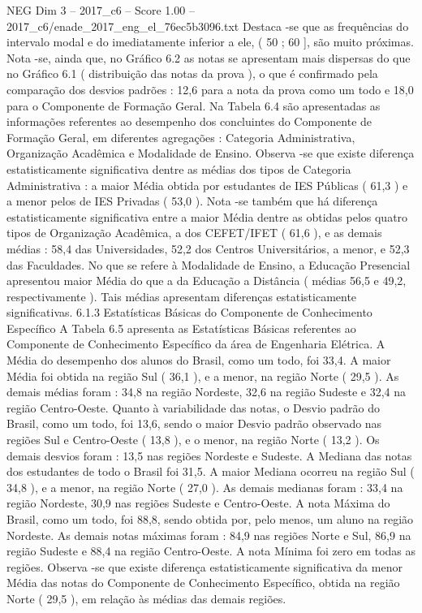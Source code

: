 \begin{textsample}{NEG Dim 3 – 2017\_c6 – Score 1.00 – 2017\_c6/enade\_2017\_eng\_el\_76ec5b3096.txt}
Destaca -se que as frequências do intervalo modal e do imediatamente inferior a ele, ( 50 ; 60 ], são muito próximas.
Nota -se, ainda que, no Gráfico 6.2 as notas se apresentam mais dispersas do que no Gráfico 6.1 ( distribuição das notas da prova ), o que é confirmado pela comparação dos desvios padrões : 12,6 para a nota da prova como um todo e 18,0 para o Componente de Formação Geral.
Na Tabela 6.4 são apresentadas as informações referentes ao desempenho dos concluintes do Componente de Formação Geral, em diferentes agregações : Categoria Administrativa, Organização Acadêmica e Modalidade de Ensino.
Observa -se que existe diferença estatisticamente significativa dentre as médias dos tipos de Categoria Administrativa : a maior Média obtida por estudantes de IES Públicas ( 61,3 ) e a menor pelos de IES Privadas ( 53,0 ).
Nota -se também que há diferença estatisticamente significativa entre a maior Média dentre as obtidas pelos quatro tipos de Organização Acadêmica, a dos CEFET/IFET ( 61,6 ), e as demais médias : 58,4 das Universidades, 52,2 dos Centros Universitários, a menor, e 52,3 das Faculdades.
No que se refere à Modalidade de Ensino, a Educação Presencial apresentou maior Média do que a da Educação a Distância ( médias 56,5 e 49,2, respectivamente ).
Tais médias apresentam diferenças estatisticamente significativas. 6.1.3 Estatísticas Básicas do Componente de Conhecimento Específico A Tabela 6.5 apresenta as Estatísticas Básicas referentes ao Componente de Conhecimento Específico da área de Engenharia Elétrica.
A Média do desempenho dos alunos do Brasil, como um todo, foi 33,4.
A maior Média foi obtida na região Sul ( 36,1 ), e a menor, na região Norte ( 29,5 ).
As demais médias foram : 34,8 na região Nordeste, 32,6 na região Sudeste e 32,4 na região Centro-Oeste.
Quanto à variabilidade das notas, o Desvio padrão do Brasil, como um todo, foi 13,6, sendo o maior Desvio padrão observado nas regiões Sul e Centro-Oeste ( 13,8 ), e o menor, na região Norte ( 13,2 ).
Os demais desvios foram : 13,5 nas regiões Nordeste e Sudeste.
A Mediana das notas dos estudantes de todo o Brasil foi 31,5.
A maior Mediana ocorreu na região Sul ( 34,8 ), e a menor, na região Norte ( 27,0 ).
As demais medianas foram : 33,4 na região Nordeste, 30,9 nas regiões Sudeste e Centro-Oeste.
A nota Máxima do Brasil, como um todo, foi 88,8, sendo obtida por, pelo menos, um aluno na região Nordeste.
As demais notas máximas foram : 84,9 nas regiões Norte e Sul, 86,9 na região Sudeste e 88,4 na região Centro-Oeste.
A nota Mínima foi zero em todas as regiões.
Observa -se que existe diferença estatisticamente significativa da menor Média das notas do Componente de Conhecimento Específico, obtida na região Norte ( 29,5 ), em relação às médias das demais regiões.

\end{textsample}
